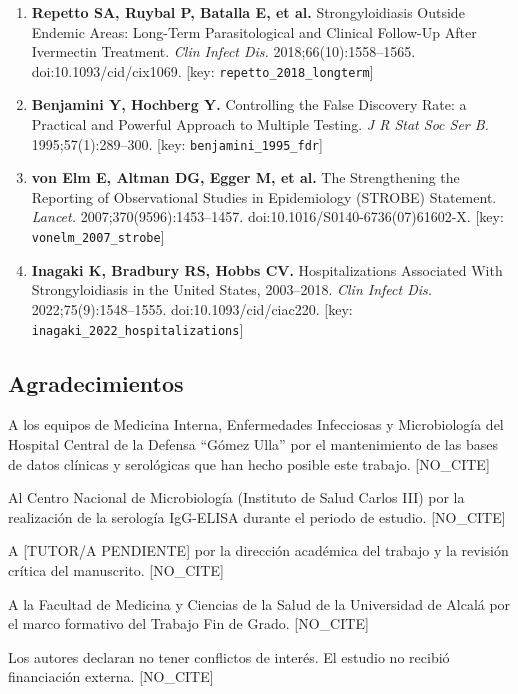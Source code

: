 \documentclass[
  spanish,
  12pt,
  a4paper,
]{article}
\begin{document}
\begin{enumerate}
\item
  \textbf{Repetto SA, Ruybal P, Batalla E, et al.} Strongyloidiasis
  Outside Endemic Areas: Long-Term Parasitological and Clinical
  Follow-Up After Ivermectin Treatment. \emph{Clin Infect Dis.}
  2018;66(10):1558--1565. doi:10.1093/cid/cix1069. {[}key:
  \texttt{repetto\_2018\_longterm}{]}
\item
  \textbf{Benjamini Y, Hochberg Y.} Controlling the False Discovery
  Rate: a Practical and Powerful Approach to Multiple Testing. \emph{J R
  Stat Soc Ser B.} 1995;57(1):289--300. {[}key:
  \texttt{benjamini\_1995\_fdr}{]}
\item
  \textbf{von Elm E, Altman DG, Egger M, et al.} The Strengthening the
  Reporting of Observational Studies in Epidemiology (STROBE) Statement.
  \emph{Lancet.} 2007;370(9596):1453--1457.
  doi:10.1016/S0140-6736(07)61602-X. {[}key:
  \texttt{vonelm\_2007\_strobe}{]}
\item
  \textbf{Inagaki K, Bradbury RS, Hobbs CV.} Hospitalizations Associated
  With Strongyloidiasis in the United States, 2003--2018. \emph{Clin
  Infect Dis.} 2022;75(9):1548--1555. doi:10.1093/cid/ciac220. {[}key:
  \texttt{inagaki\_2022\_hospitalizations}{]}
\end{enumerate}

\newpage

\subsection*{Agradecimientos}\label{agradecimientos}

A los equipos de Medicina Interna, Enfermedades Infecciosas y
Microbiología del Hospital Central de la Defensa ``Gómez Ulla'' por el
mantenimiento de las bases de datos clínicas y serológicas que han hecho
posible este trabajo. {[}NO\_CITE{]}

Al Centro Nacional de Microbiología (Instituto de Salud Carlos III) por
la realización de la serología IgG-ELISA durante el periodo de estudio.
{[}NO\_CITE{]}

A {[}TUTOR/A PENDIENTE{]} por la dirección académica del trabajo y la
revisión crítica del manuscrito. {[}NO\_CITE{]}

A la Facultad de Medicina y Ciencias de la Salud de la Universidad de
Alcalá por el marco formativo del Trabajo Fin de Grado. {[}NO\_CITE{]}

Los autores declaran no tener conflictos de interés. El estudio no
recibió financiación externa. {[}NO\_CITE{]}
\end{document}
